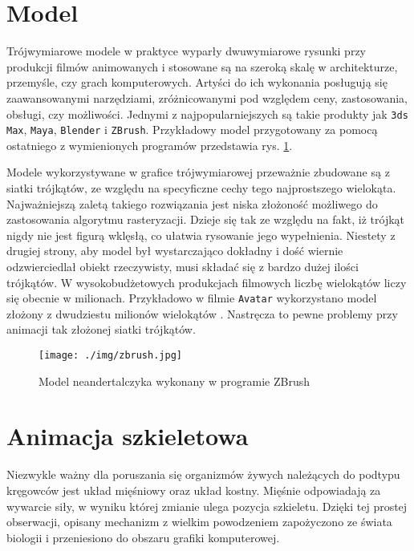 \documentclass[11pt]{mwrep}
\begin{document}
  \section{Model}
Trójwymiarowe modele w praktyce wyparły dwuwymiarowe rysunki przy produkcji filmów animowanych i stosowane są na szeroką skalę w architekturze, przemyśle, czy grach komputerowych. Artyści do ich wykonania posługują się zaawansowanymi narzędziami, zróżnicowanymi pod względem ceny, zastosowania, obsługi, czy możliwości. Jednymi z najpopularniejszych są takie produkty jak \texttt{3ds Max}, \texttt{Maya}, \texttt{Blender} i \texttt{ZBrush}. Przykładowy model przygotowany za pomocą ostatniego z wymienionych programów przedstawia rys. \ref{img:zbrush}.

Modele wykorzystywane w grafice trójwymiarowej przeważnie zbudowane są z siatki trójkątów, ze względu na specyficzne cechy tego najprostszego wielokąta. Najważniejszą zaletą takiego rozwiązania jest niska złożoność możliwego do zastosowania algorytmu rasteryzacji. Dzieje się tak ze względu na fakt, iż trójkąt nigdy nie jest figurą wklęsłą, co ułatwia rysowanie jego wypełnienia. Niestety z drugiej strony, aby model był wystarczająco dokładny i dość wiernie odzwierciedlał obiekt rzeczywisty, musi składać się z bardzo dużej ilości trójkątów. W wysokobudżetowych produkcjach filmowych liczbę wielokątów liczy się obecnie w milionach. Przykładowo w filmie \texttt{Avatar} wykorzystano model złożony z dwudziestu milionów wielokątów \cite{avatar}. Nastręcza to pewne problemy przy animacji tak złożonej siatki trójkątów.

    \begin{figure}
  \centering
    \texttt{[image: ./img/zbrush.jpg]}
  \caption{Model neandertalczyka wykonany w programie ZBrush \cite{zbrush}}
  \label{img:zbrush}
  \end{figure}
  \section{Animacja szkieletowa}

Niezwykle ważny dla poruszania się organizmów żywych należących do podtypu kręgowców jest układ mięśniowy oraz układ kostny. Mięśnie odpowiadają za wywarcie siły, w wyniku której zmianie ulega pozycja szkieletu. Dzięki tej prostej obserwacji, opisany mechanizm z wielkim powodzeniem zapożyczono ze świata biologii i przeniesiono do obszaru grafiki komputerowej.
\end{document}
